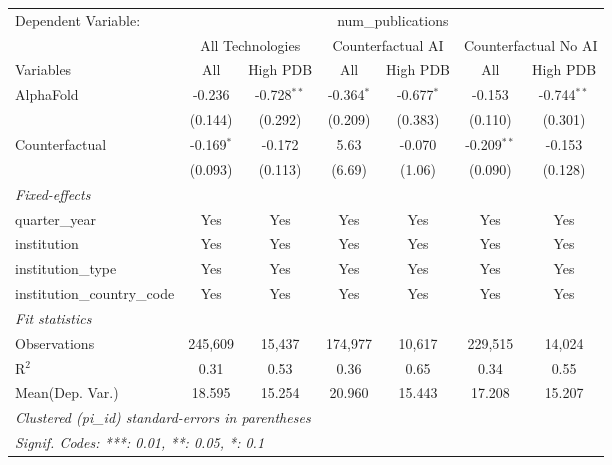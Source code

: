 \begingroup
\centering
\begin{tabular}{lcccccc}
   \tabularnewline \midrule \midrule
   Dependent Variable: & \multicolumn{6}{c}{num\_publications}\\
 & \multicolumn{2}{c}{All Technologies} & \multicolumn{2}{c}{Counterfactual AI} & \multicolumn{2}{c}{Counterfactual No AI} \\
\cmidrule(lr){1-1}\cmidrule(lr){2-3} \cmidrule(lr){4-5} \cmidrule(lr){6-7}
Variables & \multicolumn{1}{c}{All} & \multicolumn{1}{c}{High PDB} & \multicolumn{1}{c}{All} & \multicolumn{1}{c}{High PDB} & \multicolumn{1}{c}{All} & \multicolumn{1}{c}{High PDB} \\
\cmidrule(lr){1-1}\cmidrule(lr){2-2} \cmidrule(lr){3-3} \cmidrule(lr){4-4} \cmidrule(lr){5-5} \cmidrule(lr){6-6} \cmidrule(lr){7-7}
   AlphaFold                    & -0.236       & -0.728$^{**}$ & -0.364$^{*}$ & -0.677$^{*}$ & -0.153        & -0.744$^{**}$\\   
                                & (0.144)      & (0.292)       & (0.209)      & (0.383)      & (0.110)       & (0.301)\\   
   Counterfactual               & -0.169$^{*}$ & -0.172        & 5.63         & -0.070       & -0.209$^{**}$ & -0.153\\   
                                & (0.093)      & (0.113)       & (6.69)       & (1.06)       & (0.090)       & (0.128)\\   
   \midrule
   \emph{Fixed-effects}\\
   quarter\_year                & Yes          & Yes           & Yes          & Yes          & Yes           & Yes\\  
   institution                  & Yes          & Yes           & Yes          & Yes          & Yes           & Yes\\  
   institution\_type            & Yes          & Yes           & Yes          & Yes          & Yes           & Yes\\  
   institution\_country\_code   & Yes          & Yes           & Yes          & Yes          & Yes           & Yes\\  
   \midrule
   \emph{Fit statistics}\\
   Observations                 & 245,609      & 15,437        & 174,977      & 10,617       & 229,515       & 14,024\\  
   R$^2$                        & 0.31         & 0.53          & 0.36         & 0.65         & 0.34          & 0.55\\  
Mean(Dep. Var.) & 18.595 & 15.254 & 20.960 & 15.443 & 17.208 & 15.207 \\
   \midrule \midrule
   \multicolumn{7}{l}{\emph{Clustered (pi\_id) standard-errors in parentheses}}\\
   \multicolumn{7}{l}{\emph{Signif. Codes: ***: 0.01, **: 0.05, *: 0.1}}\\
\end{tabular}
\par\endgroup
